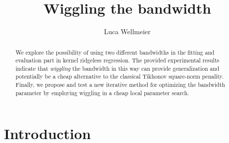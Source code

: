\documentclass[12pt]{amsart}
\title{Wiggling the bandwidth}
\author{Luca Wellmeier}
\begin{document}
\begin{abstract}
    We explore the possibility of using two different bandwidths in the 
    fitting and evaluation part in kernel ridgeless regression.
    The provided experimental results indicate that \textit{wiggling}
    the bandwidth in this way can provide generalization and potentially 
    be a cheap alternative to the classical Tikhonov square-norm penality.
    Finally, we propose and test a new iterative method for optimizing the 
    bandwidth parameter by employing wiggling in a cheap local parameter 
    search.
\end{abstract}
\maketitle
\tableofcontents

\section{Introduction}
\end{document}
